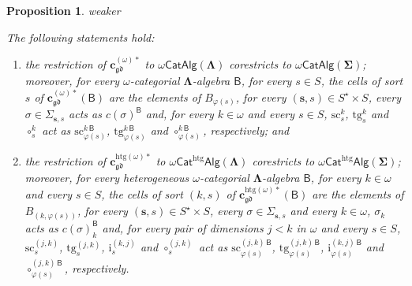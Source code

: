 \documentclass[a4paper, reqno]{amsbook}
\makeatletter
\newcommand{\sig}[1]{\mathbf{#1}}             %
\newcommand{\calg}[1]{\boldsymbol{\mathsf{#1}}} %
\newcommand{\gd}{\mathfrak{gd}}              %
\newcommand{\htg}{\mathrm{htg}}                %
\newcommand{\src}{\mathrm{sc}}
\newcommand{\tgt}{\mathrm{tg}}
\theoremstyle{plain}
\newtheorem{proposition}[theorem]{Proposition}
\theoremstyle{definition}
\newcommand*{\CA@leanpending}{}
\newcommand*{\CA@leanrelation}{}
\newcommand*{\lean}[2]{%
  \ifcsname\string\color@lean@#1\endcsname\else
    \PackageError{main}{Unknown relation `#1' in \string\lean}{Use equivalent, weaker or stronger.}%
  \fi
  \gdef\CA@leanrelation{#1}%
  \gdef\CA@leanpending{#2}}
\makeatother
\begin{document}
\begin{proposition}\label{PChangeSigEpVarietyOmega}\lean{weaker}{ChangeOfSignature.homogeneous_finiteCells,ChangeOfSignature.homogeneousOmegaFunctor,ChangeOfSignature.heterogeneous_isModel,ChangeOfSignature.homogeneousRealization,ChangeOfSignature.heterogeneousRealization}
The following statements hold:
\begin{enumerate}
\item the restriction of $\mathbf{c}^{(\omega)\ast}_{\gd}$ to $\omega\mathsf{CatAlg}(\sig{\Lambda})$ corestricts to $\omega\mathsf{CatAlg}(\sig{\Sigma})$; moreover, for every $\omega$-categorial $\sig{\Lambda}$-algebra $\calg{B}$, for every $s\in S$, the cells of sort $s$ of $\mathbf{c}^{(\omega)\ast}_{\gd}(\calg{B})$ are the elements of $B_{\varphi(s)}$, for every $(\mathbf{s},s)\in S^{\star}\times S$, every $\sigma\in\Sigma_{\mathbf{s},s}$ acts as $c(\sigma)^{\calg{B}}$ and, for every $k\in\omega$ and every $s\in S$, $\src^{k}_{s}$, $\tgt^{k}_{s}$ and $\circ^{k}_{s}$ act as $\src^{k\,\calg{B}}_{\varphi(s)}$, $\tgt^{k\,\calg{B}}_{\varphi(s)}$ and $\circ^{k\,\calg{B}}_{\varphi(s)}$, respectively; and
\item the restriction of $\mathbf{c}^{\htg(\omega)\ast}_{\gd}$ to $\omega\mathsf{Cat}^{\htg}\mathsf{Alg}(\sig{\Lambda})$ corestricts to $\omega\mathsf{Cat}^{\htg}\mathsf{Alg}(\sig{\Sigma})$; moreover, for every heterogeneous $\omega$-categorial $\sig{\Lambda}$-algebra $\calg{B}$, for every $k\in\omega$ and every $s\in S$, the cells of sort $(k,s)$ of $\mathbf{c}^{\htg(\omega)\ast}_{\gd}(\calg{B})$ are the elements of $B_{(k,\varphi(s))}$, for every $(\mathbf{s},s)\in S^{\star}\times S$, every $\sigma\in\Sigma_{\mathbf{s},s}$ and every $k\in\omega$, $\sigma_{k}$ acts as $c(\sigma)_{k}^{\calg{B}}$ and, for every pair of dimensions $j<k$ in $\omega$ and every $s\in S$, $\src^{(j,k)}_{s}$, $\tgt^{(j,k)}_{s}$, $\mathrm{i}^{(k,j)}_{s}$ and $\circ^{(j,k)}_{s}$ act as $\src^{(j,k)\,\calg{B}}_{\varphi(s)}$, $\tgt^{(j,k)\,\calg{B}}_{\varphi(s)}$, $\mathrm{i}^{(k,j)\,\calg{B}}_{\varphi(s)}$ and $\circ^{(j,k)\,\calg{B}}_{\varphi(s)}$, respectively.
\end{enumerate}
\end{proposition}
\end{document}

